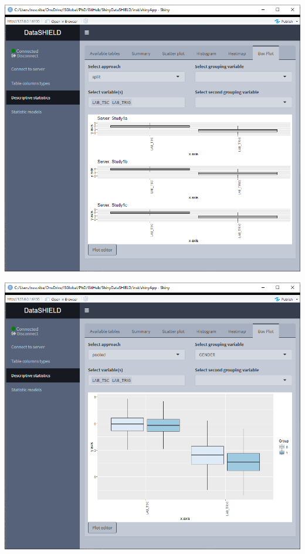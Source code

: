 \documentclass[
]{book}
\begin{document}
\includegraphics{images/descriptive_stats6_2.png}

\includegraphics{images/descriptive_stats6_3.png}
\end{document}
